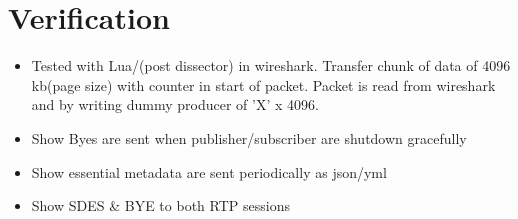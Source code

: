 \chapter{Verification} \label{chp:verification}
\begin{itemize}
	\item Tested with Lua/(post dissector) in wireshark. Transfer chunk of data of 4096 kb(page size) with counter in start of packet. Packet is read from wireshark and by writing dummy producer of 'X' x 4096.

	\item Show Byes are sent when publisher/subscriber are shutdown gracefully

	\item Show essential metadata are sent periodically as json/yml
	\item Show SDES \& BYE to both RTP sessions
	
\end{itemize}






